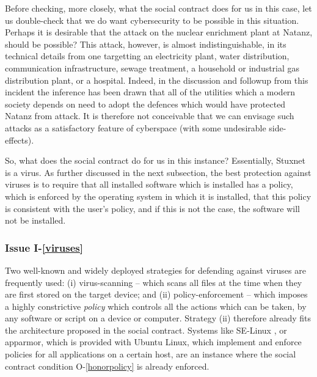 Before checking, more closely, what the social contract does for us in
this case, let us double-check that we do want cybersecurity to be possible
in this situation. Perhaps it is desirable that the attack
on the nuclear enrichment plant at Natanz, should be possible?
This attack, however, is almost indistinguishable, in its technical details
from one targetting an electricity plant, water distribution, communication
infrastructure, sewage treatment, a household or industrial gas distribution plant,
or a hospital. Indeed, in the discussion and followup from this incident
the inference has been drawn that all of the utilities which a modern society
depends on need to adopt the defences which would have protected Natanz from
attack. It is therefore not conceivable that we can envisage such attacks as
a satisfactory feature of cyberspace (with some undesirable side-effects).

So, what does the social contract do for us in this instance?
Essentially, Stuxnet is a virus. As further discussed in the next
subsection, the best protection against viruses is to require that all
installed software which is installed has a policy,  which is enforced
by the operating system in which it is installed, that this policy is
consistent with the user's policy, and if this is not the case, the
software will not be installed.
\fi

\subsubsection*{Issue I-\ref{viruses}}\label{virusessol}

Two well-known and widely deployed strategies for defending against
viruses are frequently used: (i) virus-scanning -- which scans all files
at the time when they are first stored on the target device; and (ii)
policy-enforcement -- which imposes a highly constrictive {\em policy}
which controls all the actions which can be taken, by any software or
script on a device or computer.  
%
Strategy (ii) therefore already fits the architecture proposed in the
social contract. Systems like SE-Linux \cite{SELinux}, or
apparmor, which is provided with Ubuntu Linux, which implement and enforce
policies for all applications on a certain host, are an instance where
the social contract condition O-\ref{honorpolicy} is already enforced.



